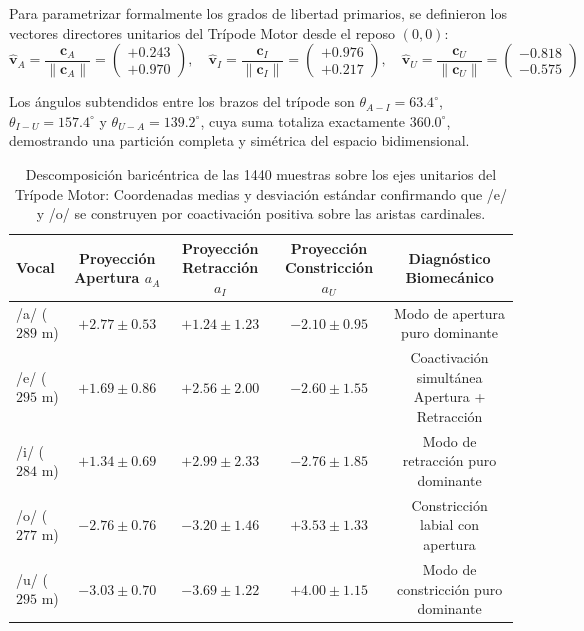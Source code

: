 \documentclass[11pt,a4paper,openany]{book}
\theoremstyle{definition}
\begin{document}
Para parametrizar formalmente los grados de libertad primarios, se definieron los vectores directores unitarios del Trípode Motor desde el reposo $(0, 0)$:
\begin{equation}
    \hat{\mathbf{v}}_A = \frac{\mathbf{c}_A}{\|\mathbf{c}_A\|} = \begin{pmatrix} +0.243 \\ +0.970 \end{pmatrix}, \quad 
    \hat{\mathbf{v}}_I = \frac{\mathbf{c}_I}{\|\mathbf{c}_I\|} = \begin{pmatrix} +0.976 \\ +0.217 \end{pmatrix}, \quad 
    \hat{\mathbf{v}}_U = \frac{\mathbf{c}_U}{\|\mathbf{c}_U\|} = \begin{pmatrix} -0.818 \\ -0.575 \end{pmatrix}
\end{equation}

Los ángulos subtendidos entre los brazos del trípode son $\theta_{A-I} = 63.4^\circ$, $\theta_{I-U} = 157.4^\circ$ y $\theta_{U-A} = 139.2^\circ$, cuya suma totaliza exactamente $360.0^\circ$, demostrando una partición completa y simétrica del espacio bidimensional.

\begin{table}[H]
\centering
\small
\begin{tabular}{lcccc}
\toprule
\textbf{Vocal} & \textbf{Proyección Apertura $a_A$} & \textbf{Proyección Retracción $a_I$} & \textbf{Proyección Constricción $a_U$} & \textbf{Diagnóstico Biomecánico} \\
\midrule
/a/ ($289$ m) & $\mathbf{+2.77 \pm 0.53}$ & $+1.24 \pm 1.23$          & $-2.10 \pm 0.95$ & Modo de apertura puro dominante \\
/e/ ($295$ m) & $\mathbf{+1.69 \pm 0.86}$ & $\mathbf{+2.56 \pm 2.00}$ & $-2.60 \pm 1.55$ & Coactivación simultánea Apertura + Retracción \\
/i/ ($284$ m) & $+1.34 \pm 0.69$          & $\mathbf{+2.99 \pm 2.33}$ & $-2.76 \pm 1.85$ & Modo de retracción puro dominante \\
/o/ ($277$ m) & $-2.76 \pm 0.76$          & $-3.20 \pm 1.46$          & $\mathbf{+3.53 \pm 1.33}$ & Constricción labial con apertura \\
/u/ ($295$ m) & $-3.03 \pm 0.70$          & $-3.69 \pm 1.22$          & $\mathbf{+4.00 \pm 1.15}$ & Modo de constricción puro dominante \\
\bottomrule
\end{tabular}
\caption{Descomposición baricéntrica de las 1440 muestras sobre los ejes unitarios del Trípode Motor: Coordenadas medias y desviación estándar confirmando que /e/ y /o/ se construyen por coactivación positiva sobre las aristas cardinales.}
\label{tab:coordenadas_tripode_motor}
\end{table}
\end{document}
